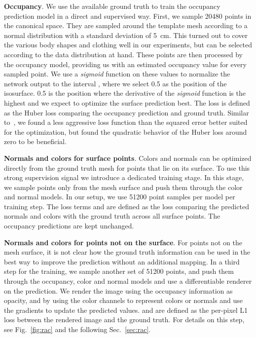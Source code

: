 \documentclass[10pt,twocolumn,letterpaper]{article}
\begin{document}
\textbf{Occupancy}. We use the available ground truth to train the occupancy prediction model in a direct and supervised way. First, we sample \num{20480} points in the canonical space. They are sampled around the template mesh according to a normal distribution with a standard deviation of \SI{5}{cm}. This turned out to cover the various body shapes and clothing well in our experiments, but can be selected according to the data distribution at hand. These points are then processed by the occupancy model, providing us with an estimated occupancy value for every sampled point. We use a \textit{sigmoid} function on these values to normalize the network output to the interval , where we select \num{0.5} as the position of the isosurface. \num{0.5} is the position where the derivative of the \textit{sigmoid} function is the highest and we expect to optimize the surface prediction best. The loss  is defined as the Huber loss comparing the occupancy prediction and ground truth. Similar to~\cite{Park_2019_CVPR}, we found a less aggressive loss function than the squared error better suited for the optimization, but found the quadratic behavior of the Huber loss around zero to be beneficial.

\textbf{Normals and colors for surface points}. Colors and normals can be optimized directly from the ground truth mesh for points that lie on its surface. To use this strong supervision signal we introduce a dedicated training stage. In this stage, we sample points only from the mesh surface and push them through the color and normal models. In our setup, we use \num{51200} point samples per model per training step. The loss terms  and  are defined as the  loss comparing the predicted normals and colors with the ground truth across all surface points. The occupancy predictions are kept unchanged.

\textbf{Normals and colors for points not on the surface}. For points not on the mesh surface, it is not clear how the ground truth information can be used in the best way to improve the prediction without an additional mapping. In a third step for the training, we sample another set of \num{51200} points, and push them through the occupancy, color and normal models and use a differentiable renderer on the prediction. We render the image using the occupancy information as opacity, and by using the color channels to represent colors or normals and use the gradients to update the predicted values.  and  are defined as the per-pixel L1 loss between the rendered image and the ground truth. For details on this step, see Fig.~\ref{fig:rac} and the following Sec.~\ref{sec:rac}.
\end{document}
